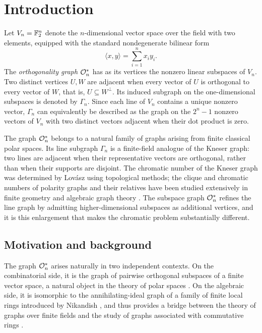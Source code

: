 \section{Introduction}
\label{sec:intro}

Let \(V_n=\mathbb F_2^n\) denote the \(n\)-dimensional vector space over the
field with two elements, equipped with the standard nondegenerate
bilinear form
\[
\langle x,y\rangle=\sum_{i=1}^n x_i y_i .
\]
The \emph{orthogonality graph} \(\mathcal O_n^*\) has as its vertices the
nonzero linear subspaces of \(V_n\).  Two distinct vertices \(U,W\)
are adjacent when every vector of \(U\) is orthogonal to every vector
of \(W\), that is, \(U\subseteq W^\perp\).  Its induced subgraph on
the one-dimensional subspaces is denoted by \(\Gamma_n\).  Since each
line of \(V_n\) contains a unique nonzero vector, \(\Gamma_n\) can
equivalently be described as the graph on the \(2^n-1\) nonzero
vectors of \(V_n\) with two distinct vectors adjacent when their dot
product is zero.

The graph \(\mathcal O_n^*\) belongs to a natural family of graphs arising
from finite classical polar spaces.  Its line subgraph \(\Gamma_n\) is
a finite-field analogue of the Kneser graph: two lines are adjacent
when their representative vectors are orthogonal, rather than when
their supports are disjoint.  The chromatic number of the Kneser
graph was determined by Lov\'asz \cite{Lovasz1978} using topological
methods; the clique and chromatic numbers of polarity graphs and
their relatives have been studied extensively in finite geometry and
algebraic graph theory
\cite{BrouwerCohenNeumaier1989,GodsilRoyle2001,BrouwerHaemers2012}.
The subspace graph \(\mathcal O_n^*\) refines the line graph by admitting
higher-dimensional subspaces as additional vertices, and it is this
enlargement that makes the chromatic problem substantially different.

\subsection*{Motivation and background}

The graph \(\mathcal O_n^*\) arises naturally in two independent contexts.
On the combinatorial side, it is the graph of pairwise orthogonal
subspaces of a finite vector space, a natural object in the theory of
polar spaces \cite{Cameron1991}.  On the algebraic side, it is
isomorphic to the annihilating-ideal graph of a family of finite
local rings introduced by Nikandish \cite{Nikandish2026}, and thus
provides a bridge between the theory of graphs over finite fields
and the study of graphs associated with commutative rings
\cite{Beck1988,AndersonNaseer1993,AndersonLivingston1999,
BehboodiRakeei2011a,BehboodiRakeei2011b}.

